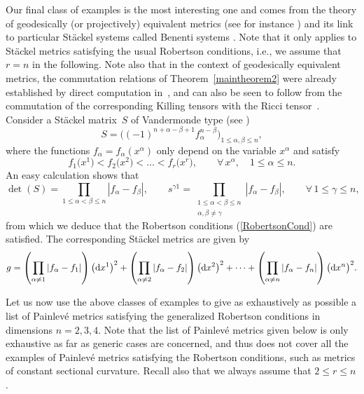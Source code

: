 \documentclass[pdftex]{sigma}
\numberwithin{equation}{section}
\begin{document}
\begin{Example} \label{Exem2}
Our final class of examples is the most interesting one and comes from the theory of geodesically (or projectively) equivalent metrics (see for instance \cite{BoMa2015, Ma2005, Top1999, Top2002, TopMa2003}) and its link to particular St\"ackel systems called Benenti systems \cite{Ben2016, BoMa2003}. Note that it only applies to St\"ackel metrics satisfying the usual Robertson conditions, i.e., we assume that $r = n$ in the following. Note also that in the context of geodesically equivalent metrics, the commutation relations of Theorem~\ref{maintheorem2} were already established by direct computation in~\cite{MaTop2001}, and can also be seen to follow from the commutation of the corresponding Killing tensors with the Ricci tensor~\cite{MaKio2009}. Consider a St\"ackel matrix~$S$ of Vandermonde type (see \cite[Theorem~8.5]{Ben2016})
\[
 S = \big( (-1)^{n+\alpha - \beta + 1} f_\alpha^{n-\beta} \big)_{1 \leq \alpha, \beta \leq n},
 \]
where the functions $f_\alpha = f_\alpha(x^\alpha)$ only depend on the variable $x^\alpha$ and satisfy
\[
 f_1\big(x^1\big) < f_2\big(x^2\big) < \dots < f_r\big(x^r\big), \qquad \forall\, x^\alpha, \quad 1 \leq \alpha \leq n.
\]
An easy calculation shows that
\[
 \det(S) = \prod_{1 \leq \alpha < \beta \leq n} |f_\alpha - f_\beta|, \qquad s^{\gamma 1} = \prod_{\substack{ 1 \leq \alpha < \beta \leq n \\ \alpha, \beta \ne \gamma }} |f_\alpha - f_\beta|, \qquad \forall\, 1 \leq \gamma \leq n,
\]
from which we deduce that the Robertson conditions (\ref{RobertsonCond}) are satisfied. The corresponding St\"ackel metrics are given by
\begin{gather*} %
 g = \left( \prod_{\alpha \ne 1} |f_\alpha - f_1| \right) \big({\rm d}x^1\big)^2 + \left( \prod_{\alpha \ne 2} |f_\alpha - f_2| \right) \big({\rm d}x^2\big)^2 + \dots + \left( \prod_{\alpha \ne n} |f_\alpha - f_n| \right) \big({\rm d}x^n\big)^2.
\end{gather*}
\end{Example}

Let us now use the above classes of examples to give as exhaustively as possible a list of Painlev\'e metrics satisfying the generalized Robertson conditions in dimensions $n=2, 3, 4$. Note that the list of Painlev\'e metrics given below is only exhaustive as far as generic cases are concerned, and thus does not cover all the examples of Painlev\'e metrics satisfying the Robertson conditions, such as metrics of constant sectional curvature. Recall also that we always assume that $2 \leq r \leq n$.
\end{document}
